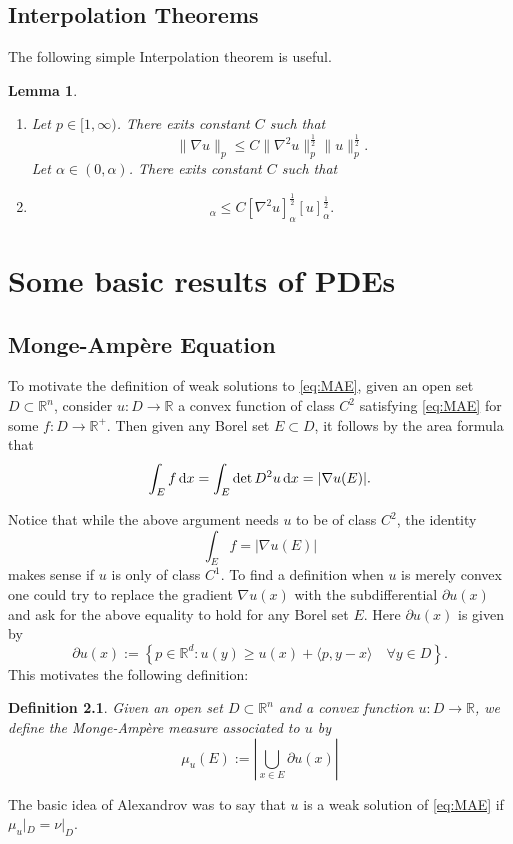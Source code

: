 \documentclass[twoside, 12pt]{book}
\numberwithin{equation}{chapter}
\def\theequation{\arabic{chapter}.\arabic{equation}}
\newtheorem{lemma}[theorem]{Lemma}
\newtheorem{definition}[theorem]{Definition}
\def\geq{\geqslant}
\def\leq{\leqslant}
\def\p{\partial}
\def\d{\text{\rm{d}}}
\begin{document}
    \section{Interpolation Theorems} 
    The following simple Interpolation theorem is useful. 
	\begin{lemma}\label{lem:Inter}
		 
	    \begin{enumerate}
	        \item Let $p\in[1,\infty)$. There exits constant $C$ such that 
         \begin{equation}
             \|\nabla u\|_p\leq C \|\nabla^2 u\|_p^{\frac{1}{2}}\|u\|_p^{\frac{1}{2}}. 
         \end{equation}
            Let $\alpha\in (0,\alpha)$. There exits constant $C$ such that 
            \item \begin{equation}
                [\nabla u]_\alpha\leq C [\nabla^2 u]_\alpha^{\frac{1}{2}} [u]_{\alpha}^{\frac{1}{2}}. 
            \end{equation}
	    \end{enumerate}
	\end{lemma}
	
	
	
	\chapter{Some basic results of  PDEs} 
	
	\section{Monge-Ampère Equation}\label{app:MAE}
     \setcounter{equation}{0}
     \renewcommand\theequation{B.\arabic{equation}}
	To motivate the definition of weak solutions to \eqref{eq:MAE}, given an open set $D \subset \mathbb{R}^n$, consider $u: D \rightarrow \mathbb{R}$ a convex function of class $C^2$ satisfying \eqref{eq:MAE} 
	for some $f: D \rightarrow \mathbb{R}^{+}$. Then given any Borel set $E \subset D$, it follows by the area formula that
	$$
	\int_E f \,\d x=\int_E \operatorname{det} D^2 u\, \d x=|\nabla u(E)| .
	$$
	
	Notice that while the above argument needs $u$ to be of class $C^2$, the identity
	$$
	\int_E f=|\nabla u(E)|
	$$
	makes sense if $u$ is only of class $C^1$. To find a definition when $u$ is merely convex one could try to replace the gradient $\nabla u(x)$ with the subdifferential $\partial u(x)$ and ask for the above equality to hold for any Borel set $E$. Here $\p u(x)$ is given by 
	$$
	\partial u(x):=\left\{p \in \mathbb{R}^d: u(y) \geq u(x)+\langle p, y-x\rangle \quad \forall y \in D\right\}. 
	$$
	This motivates the following definition:
	\begin{definition}
		Given an open set $D \subset \mathbb{R}^n$ and a convex function $u: D \rightarrow \mathbb{R}$, we define the Monge-Ampère measure associated to $u$ by
		$$
		\mu_u(E):=\left|\bigcup_{x \in E} \partial u(x)\right|
		$$
	\end{definition}
	The basic idea of Alexandrov was to say that $u$ is a weak solution
	of \eqref{eq:MAE} if $\mu_u|_{D}=\nu|_{D}$. 
	
\end{document}
